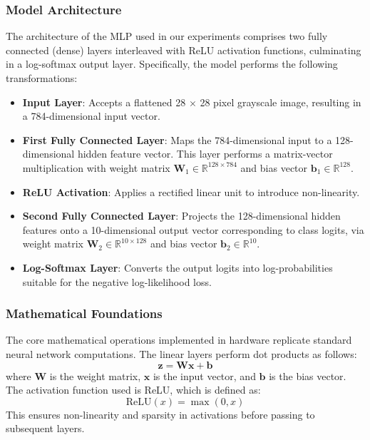 \documentclass[12pt,letterpaper]{article}
\begin{document}
\subsubsection{Model Architecture}

The architecture of the MLP used in our experiments comprises two fully connected (dense) layers interleaved with ReLU activation functions, culminating in a log-softmax output layer. Specifically, the model performs the following transformations:

\begin{itemize}
    \item \textbf{Input Layer}: Accepts a flattened 28 $\times$ 28 pixel grayscale image, resulting in a 784-dimensional input vector.
    \item \textbf{First Fully Connected Layer}: Maps the 784-dimensional input to a 128-dimensional hidden feature vector. This layer performs a matrix-vector multiplication with weight matrix $\mathbf{W}_1 \in \mathbb{R}^{128 \times 784}$ and bias vector $\mathbf{b}_1 \in \mathbb{R}^{128}$.
    \item \textbf{ReLU Activation}: Applies a rectified linear unit to introduce non-linearity.
    \item \textbf{Second Fully Connected Layer}: Projects the 128-dimensional hidden features onto a 10-dimensional output vector corresponding to class logits, via weight matrix $\mathbf{W}_2 \in \mathbb{R}^{10 \times 128}$ and bias vector $\mathbf{b}_2 \in \mathbb{R}^{10}$.
    \item \textbf{Log-Softmax Layer}: Converts the output logits into log-probabilities suitable for the negative log-likelihood loss.
\end{itemize}

\subsubsection{Mathematical Foundations}  
The core mathematical operations implemented in hardware replicate standard neural network computations. The linear layers perform dot products as follows:  
\begin{equation}
\mathbf{z} = \mathbf{W} \mathbf{x} + \mathbf{b}
\end{equation}  
where $\mathbf{W}$ is the weight matrix, $\mathbf{x}$ is the input vector, and $\mathbf{b}$ is the bias vector. The activation function used is ReLU, which is defined as:  
\begin{equation}
\text{ReLU}(x) = \max(0, x)
\end{equation}  
This ensures non-linearity and sparsity in activations before passing to subsequent layers.
\end{document}
